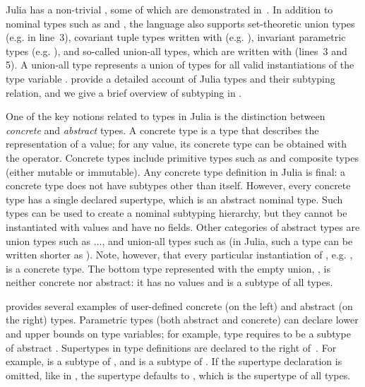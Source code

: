 Julia has a non-trivial  \ty, some of which are
demonstrated in~. In addition to nominal types such
as  and , the language also supports set-theoretic union
types (e.g.  in line~3),
covariant tuple types written with  (e.g. ),
invariant parametric types (e.g. ),
and so-called union-all types, which are written with  (lines~3 and 5).
A union-all type  represents a union of types  for all
valid instantiations of the type variable . \citet{TODO} provide a detailed
account of Julia types and their subtyping relation, and we give a brief
overview of subtyping in .

One of the key notions related to types in Julia is the distinction between
\emph{concrete} and \emph{abstract} types. A concrete type \gty is a type that
describes the representation of a value; for any value, its concrete type can be
obtained with the  operator. Concrete types include primitive types
such as  and composite  types (either mutable or
immutable). Any concrete type definition in Julia is final: a concrete type does
not have subtypes other than itself. However, every concrete type has a single
declared supertype, which is an abstract nominal type. Such types can be used
to create a nominal subtyping hierarchy, but they cannot be instantiated with
values and have no fields. Other categories of abstract types are union types
such as $\ldots$, and union-all types
such as  (in Julia, such a type can be written shorter
as ). Note, however, that every particular instantiation of
, e.g. , is a concrete type.
The bottom type represented with the empty union, , is neither
concrete nor abstract: it has no values and is a subtype of all types.

 provides several examples of user-defined
concrete (on the left) and abstract (on the right) types. Parametric types (both
abstract and concrete) can declare lower and upper bounds on type variables;
for example, type  requires  to be a subtype of
abstract .
Supertypes in type definitions are declared to the right of~\cjl{<:}.
For example,  is a subtype of , and  is a
subtype of . If the supertype declaration is omitted, like in
, the supertype defaults to ,
which is the supertype of all types.

